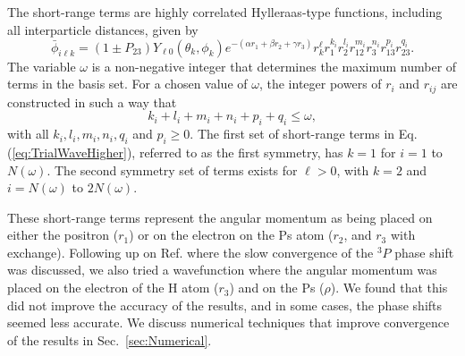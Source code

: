 \documentclass[preprint,showpacs,showkeys,preprintnumbers,amsmath,amssymb,longbibliography,pra,aps]{revtex4-1}
\newcommand{\todoi}{\todo[inline]}
\begin{document}
The short-range terms are highly correlated Hylleraas-type functions, including
all interparticle distances, given by
\begin{equation}
\label{eq:PhiDef}
\bar{\phi}_{i\ell k} = \left(1 \pm P_{23}\right) Y_{\ell 0}(\theta_k,\phi_k)
e^{-(\alpha r_1 + \beta r_2 + \gamma r_3)}
r_k^{\ell} r_1^{k_i} r_2^{l_i} r_{12}^{m_i} r_3^{n_i} r_{13}^{p_i} r_{23}^{q_i}.
\end{equation}
The variable $\omega$ is a non-negative integer that determines the maximum
number of terms in the basis set. For a chosen value of $\omega$, the integer
powers of $r_i$ and $r_{ij}$ are constructed in such a way that 
\begin{equation}
k_i + l_i + m_i + n_i + p_i + q_i \leq \omega,
\end{equation}
with all $k_i, l_i, m_i, n_i, q_i$ and $p_i \geq 0$.
The first set of short-range terms in Eq. (\ref{eq:TrialWaveHigher}), referred
to as the first symmetry, has $k=1$ for $i=1$ to $N(\omega)$. The second
symmetry set of terms exists for $\ell > 0$, with $k=2$ and $i = N(\omega)$ to
$2N(\omega)$.

These short-range terms represent the angular momentum as being placed on 
either the positron ($r_1$) or on the electron on the Ps atom ($r_2$, and $r_3$
with exchange). Following up on Ref. \cite{VanReeth2004} where the slow 
convergence of the $^3P$ phase shift was discussed, we also tried a 
wavefunction where the angular momentum was placed on the electron of the H 
atom ($r_3$) and on the Ps ($\rho$). We found that this did not improve the
accuracy of the results, and in some cases, the phase shifts seemed less
accurate. We discuss numerical techniques that improve convergence of the
results in Sec.~\ref{sec:Numerical}.

\end{document}
